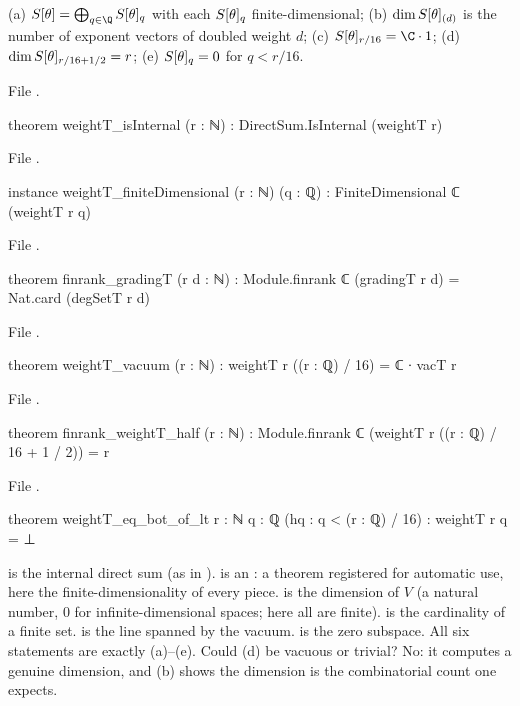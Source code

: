 \begin{theorem}\label{ch06:thm:gradingT}
(a) $\chsixS=\bigoplus_{q\in\Q}\chsixS_q$ with each $S[\theta]_q$ finite-dimensional;
(b) $\dim S[\theta]_{(d)}$ is the number of exponent vectors of doubled weight $d$;
(c) $\chsixS_{r/16}=\C\cdot 1$;
(d) $\dim S[\theta]_{r/16+1/2}=r$;
(e) $S[\theta]_q=0$ for $q<r/16$.
\end{theorem}
\noindent File .
\begin{leancode}
theorem weightT_isInternal (r : ℕ) : DirectSum.IsInternal (weightT r)
\end{leancode}
\noindent File .
\begin{leancode}
instance weightT_finiteDimensional (r : ℕ) (q : ℚ) : FiniteDimensional ℂ (weightT r q)
\end{leancode}
\noindent File .
\begin{leancode}
theorem finrank_gradingT (r d : ℕ) :
    Module.finrank ℂ (gradingT r d) = Nat.card (degSetT r d)
\end{leancode}
\noindent File .
\begin{leancode}
theorem weightT_vacuum (r : ℕ) : weightT r ((r : ℚ) / 16) = ℂ ∙ vacT r
\end{leancode}
\noindent File .
\begin{leancode}
theorem finrank_weightT_half (r : ℕ) :
    Module.finrank ℂ (weightT r ((r : ℚ) / 16 + 1 / 2)) = r
\end{leancode}
\noindent File .
\begin{leancode}
theorem weightT_eq_bot_of_lt {r : ℕ} {q : ℚ} (hq : q < (r : ℚ) / 16) : weightT r q = ⊥
\end{leancode}
\begin{dictionary}
 is the internal direct sum (as in ).
 is an : a theorem registered for automatic
use, here the finite-dimensionality of every piece.   is the dimension of
$V$ (a natural number, $0$ for infinite-dimensional spaces; here all are finite).
 is the cardinality of a finite set.   is the line spanned by the
vacuum.   is the zero subspace.  All six statements are exactly (a)--(e).  Could (d) be
vacuous or trivial?  No: it computes a genuine dimension, and (b) shows the dimension is the
combinatorial count one expects.
\end{dictionary}

